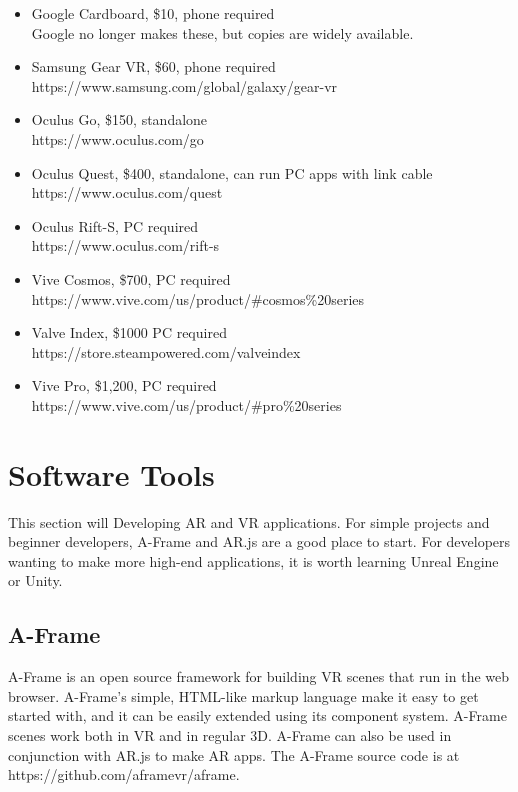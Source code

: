 \documentclass{article}
\begin{document}
\begin{itemize}
    \item Google Cardboard, \$10, phone required\\
    Google no longer makes these, but copies are widely available.
    \item Samsung Gear VR, \$60, phone required\\
    https://www.samsung.com/global/galaxy/gear-vr
    \item Oculus Go, \$150, standalone\\
    https://www.oculus.com/go
    \item Oculus Quest, \$400, standalone, can run PC apps with link cable\\
    https://www.oculus.com/quest
    \item Oculus Rift-S, PC required\\
    https://www.oculus.com/rift-s
    \item Vive Cosmos, \$700, PC required\\
    https://www.vive.com/us/product/\#cosmos\%20series
    \item Valve Index, \$1000 PC required\\
    https://store.steampowered.com/valveindex
    \item Vive Pro, \$1,200, PC required\\
    https://www.vive.com/us/product/\#pro\%20series
\end{itemize}

\section{Software Tools}
This section will Developing AR and VR applications.
For simple projects and beginner developers, A-Frame and AR.js are a good place to start. For developers wanting to make more high-end applications, it is worth learning Unreal Engine or Unity.

\subsection{A-Frame}
A-Frame is an open source framework for building VR scenes that run in the web browser. A-Frame's simple, HTML-like markup language make it easy to get started with, and it can be easily extended using its component system. A-Frame scenes work both in VR and in regular 3D. A-Frame can also be used in conjunction with AR.js to make AR apps. The A-Frame source code is at https://github.com/aframevr/aframe.
\end{document}
